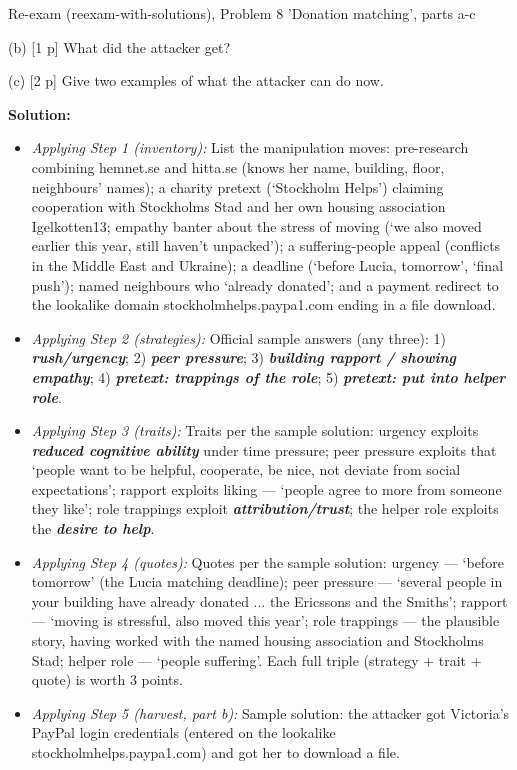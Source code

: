 \documentclass[12pt, a4paper]{article}
\newcommand{\term}[1]{\textbf{\textit{#1}}}        %
\begin{document}
\begin{practicebox}{Re-exam (reexam-with-solutions), Problem 8 'Donation matching', parts a-c}
\begin{problembox}
(b) [1 p] What did the attacker get?

(c) [2 p] Give two examples of what the attacker can do now.
\end{problembox}

\textbf{Solution:}
\begin{itemize}
    \item \textit{Applying Step 1 (inventory):} List the manipulation moves: pre-research combining hemnet.se and hitta.se (knows her name, building, floor, neighbours' names); a charity pretext (`Stockholm Helps') claiming cooperation with Stockholms Stad and her own housing association Igelkotten13;
    empathy banter about the stress of moving (`we also moved earlier this year, still haven't unpacked'); a suffering-people appeal (conflicts in the Middle East and Ukraine); a deadline (`before Lucia, tomorrow', `final push');
    named neighbours who `already donated'; and a payment redirect to the lookalike domain stockholmhelps.paypa1.com ending in a file download.
    \item \textit{Applying Step 2 (strategies):} Official sample answers (any three): 1) \term{rush/urgency}; 2) \term{peer pressure}; 3) \term{building rapport / showing empathy}; 4) \term{pretext: trappings of the role}; 5) \term{pretext: put into helper role}.
    \item \textit{Applying Step 3 (traits):} Traits per the sample solution: urgency exploits \term{reduced cognitive ability} under time pressure; peer pressure exploits that `people want to be helpful, cooperate, be nice, not deviate from social expectations';
    rapport exploits liking --- `people agree to more from someone they like'; role trappings exploit \term{attribution/trust}; the helper role exploits the \term{desire to help}.
    \item \textit{Applying Step 4 (quotes):} Quotes per the sample solution: urgency --- `before tomorrow' (the Lucia matching deadline); peer pressure --- `several people in your building have already donated ... the Ericssons and the Smiths'; rapport --- `moving is stressful, also moved this year';
    role trappings --- the plausible story, having worked with the named housing association and Stockholms Stad; helper role --- `people suffering'. Each full triple (strategy + trait + quote) is worth 3 points.
    \item \textit{Applying Step 5 (harvest, part b):} Sample solution: the attacker got Victoria's PayPal login credentials (entered on the lookalike stockholmhelps.paypa1.com) and got her to download a file.

\end{itemize}
\end{practicebox}
\end{document}
